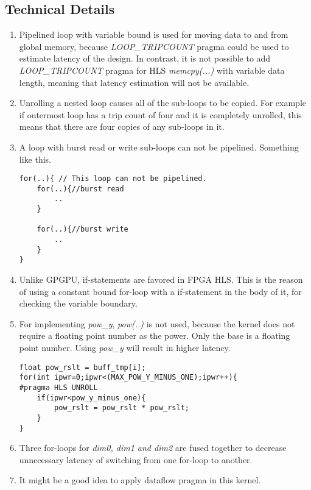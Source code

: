 \documentclass[•]{article}
\begin{document}
\subsection{Technical Details}
\begin{enumerate}
\item Pipelined loop with variable bound is used for moving data to and from global memory, because \emph{LOOP\_TRIPCOUNT} pragma could be used to estimate latency of the design. In contrast, it is not possible to add \emph{LOOP\_TRIPCOUNT} pragma for HLS \emph{memcpy(...)} with variable data length, meaning that latency estimation will not be available.

\item Unrolling a nested loop causes all of the sub-loops to be copied. For example if outermost loop has a trip count of four and it is completely unrolled, this means that there are four copies of any sub-loops in it.

\item A loop with burst read or write sub-loops can not be pipelined. Something like this.
\begin{lstlisting}
for(..){ // This loop can not be pipelined.
	for(..){//burst read
		..
	}
	
	for(..){//burst write
		..
	}
}
\end{lstlisting}

\item Unlike GPGPU, if-statements are favored in FPGA HLS. This is the reason of using a constant bound for-loop with a if-statement in the body of it, for checking the variable boundary.

\item For implementing \emph{pow\_y}, \emph{pow(..)} is not used, because the kernel does not require a floating point number as the power. Only the base is a floating point number. Using \emph{pow\_y} will result in higher latency.
\begin{lstlisting}
float pow_rslt = buff_tmp[i];
for(int ipwr=0;ipwr<(MAX_POW_Y_MINUS_ONE);ipwr++){
#pragma HLS UNROLL
	if(ipwr<pow_y_minus_one){
		pow_rslt = pow_rslt * pow_rslt;
	}
}
\end{lstlisting}

\item Three for-loops for \emph{dim0, dim1 and dim2} are fused together to decrease unnecessary latency of switching from one for-loop to another.

\item It might be a good idea to apply dataflow pragma in this kernel.

\end{enumerate}
\end{document}
